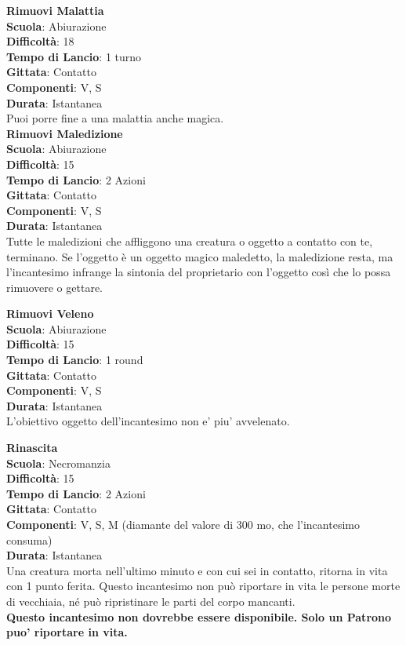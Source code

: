 \begin{multicols}{2}
\medskip\textbf{Rimuovi Malattia}\\
\textbf{Scuola}: Abiurazione\\
\textbf{Difficoltà}:  18\\
\textbf{Tempo di Lancio}: 1 turno\\
\textbf{Gittata}: Contatto\\
\textbf{Componenti}: V, S\\
\textbf{Durata}: Istantanea\\
Puoi porre fine a una malattia anche magica.\\

\medskip\textbf{Rimuovi Maledizione}\\
\textbf{Scuola}: Abiurazione\\
\textbf{Difficoltà}:  15\\
\textbf{Tempo di Lancio}: 2 Azioni\\
\textbf{Gittata}: Contatto\\
\textbf{Componenti}: V, S\\
\textbf{Durata}: Istantanea\\
Tutte le maledizioni che affliggono una creatura o oggetto a contatto con te, terminano. Se l’oggetto è un oggetto magico maledetto, la maledizione resta, ma l'incantesimo infrange la sintonia del proprietario con l’oggetto così che lo possa rimuovere o gettare.

\medskip\textbf{Rimuovi Veleno}\\
\textbf{Scuola}: Abiurazione\\
\textbf{Difficoltà}:  15\\
\textbf{Tempo di Lancio}: 1 round\\
\textbf{Gittata}: Contatto\\
\textbf{Componenti}: V, S\\
\textbf{Durata}: Istantanea\\
L'obiettivo oggetto dell'incantesimo non e' piu' avvelenato.

\medskip\textbf{Rinascita}\\
\textbf{Scuola}: Necromanzia\\
\textbf{Difficoltà}:  15\\
\textbf{Tempo di Lancio}: 2 Azioni\\
\textbf{Gittata}: Contatto\\
\textbf{Componenti}: V, S, M (diamante del valore di 300 mo, che l'incantesimo consuma)\\
\textbf{Durata}: Istantanea\\
Una creatura morta nell'ultimo minuto e con cui sei in contatto, ritorna in vita con 1 punto ferita. Questo incantesimo non può riportare in vita le persone morte di vecchiaia, né può ripristinare le parti del corpo mancanti.\\
\textbf{Questo incantesimo non dovrebbe essere disponibile. Solo un Patrono puo' riportare in vita.}


\end{multicols}

